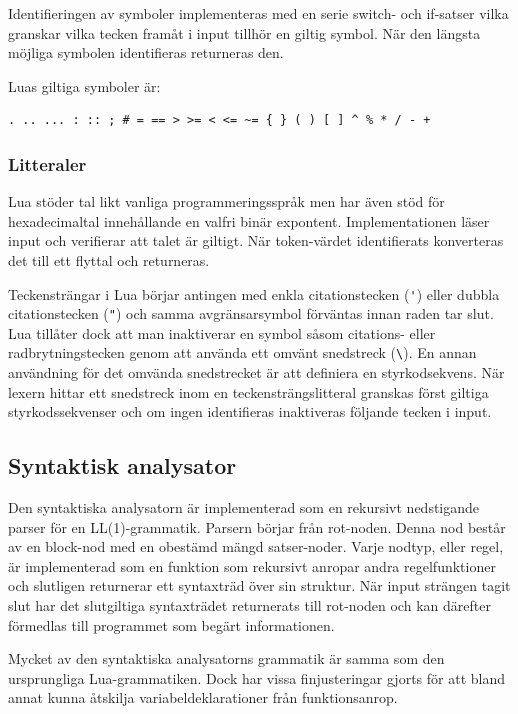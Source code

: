 Identifieringen av symboler implementeras med en serie switch- och
if-satser vilka granskar vilka tecken framåt i input tillhör en giltig
symbol. När den längsta möjliga symbolen identifieras returneras den.

Luas giltiga symboler är:
\begin{verbatim}
. .. ... : :: ; # = == > >= < <= ~= { } ( ) [ ] ^ % * / - +
\end{verbatim}

\subsubsection{Litteraler}

Lua stöder tal likt vanliga programmeringsspråk men har även stöd för
hexadecimaltal innehållande en valfri binär expontent. Implementationen läser
input och verifierar att talet är giltigt. När token-värdet identifierats
konverteras det till ett flyttal och returneras.

Teckensträngar i Lua börjar antingen med enkla citationstecken (\verb+'+)
eller dubbla citationstecken (\verb+"+) och samma avgränsarsymbol förväntas
innan raden tar slut. Lua tillåter dock att man inaktiverar en symbol såsom
citations- eller radbrytningstecken genom att använda ett omvänt snedstreck
(\verb+\+). En annan användning för det omvända snedstrecket är att definiera
en styrkodsekvens.  När lexern hittar ett snedstreck inom en
teckensträngslitteral granskas först giltiga styrkodssekvenser och om ingen
identifieras inaktiveras följande tecken i input.

\subsection{Syntaktisk analysator}

Den syntaktiska analysatorn är implementerad som en rekursivt nedstigande
parser för en LL(1)-grammatik. Parsern börjar från
rot-noden. Denna nod består av en block-nod med en obestämd mängd
satser-noder. Varje nodtyp, eller regel, är implementerad som en funktion som
rekursivt anropar andra regelfunktioner och slutligen returnerar ett
syntaxträd över sin struktur. När input strängen tagit slut har det
slutgiltiga syntaxträdet returnerats till rot-noden och kan därefter förmedlas
till programmet som begärt informationen.

Mycket av den syntaktiska analysatorns grammatik är samma som den ursprungliga
Lua-grammatiken. Dock har vissa finjusteringar gjorts för att bland annat
kunna åtskilja variabeldeklarationer från funktionsanrop.

